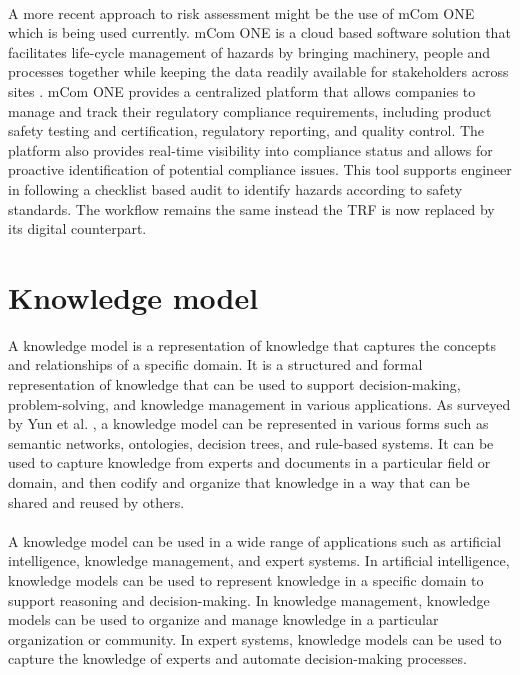 
\bigskip {}

\paragraph{} A more recent approach to risk assessment might be the use of mCom ONE which is being used currently. mCom ONE is a cloud based software solution that facilitates life-cycle management of hazards by bringing machinery, people and processes together while keeping the data readily available for stakeholders across sites \cite{mcom}. mCom ONE provides a centralized platform that allows companies to manage and track their regulatory compliance requirements, including product safety testing and certification, regulatory reporting, and quality control. The platform also provides real-time visibility into compliance status and allows for proactive identification of potential compliance issues. This tool supports engineer in following a checklist based audit to identify hazards according to safety standards. The workflow remains the same instead the TRF is now replaced by its digital counterpart. 


\bigskip {}

\section{Knowledge model}\label{km}
A knowledge model is a representation of knowledge that captures the concepts and relationships of a specific domain. It is a structured and formal representation of knowledge that can be used to support decision-making, problem-solving, and knowledge management in various applications. As surveyed by Yun et al. \cite{Yun2021}, a knowledge model can be represented in various forms such as semantic networks, ontologies, decision trees, and rule-based systems. It can be used to capture knowledge from experts and documents in a particular field or domain, and then codify and organize that knowledge in a way that can be shared and reused by others.

\paragraph{} A knowledge model can be used in a wide range of applications such as artificial intelligence, knowledge management, and expert systems. In artificial intelligence, knowledge models can be used to represent knowledge in a specific domain to support reasoning and decision-making. In knowledge management, knowledge models can be used to organize and manage knowledge in a particular organization or community. In expert systems, knowledge models can be used to capture the knowledge of experts and automate decision-making processes.

